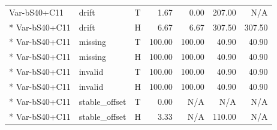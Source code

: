 \begin{small}
\begin{longtable}{lllrrrr}
Var-bS40+C11 & drift & T & 1.67 & 0.00 & 207.00 & N/A \\*
Var-bS40+C11 & drift & H & 6.67 & 6.67 & 307.50 & 307.50 \\*
Var-bS40+C11 & missing & T & 100.00 & 100.00 & 40.90 & 40.90 \\*
Var-bS40+C11 & missing & H & 100.00 & 100.00 & 40.90 & 40.90 \\*
Var-bS40+C11 & invalid & T & 100.00 & 100.00 & 40.90 & 40.90 \\*
Var-bS40+C11 & invalid & H & 100.00 & 100.00 & 40.90 & 40.90 \\*
Var-bS40+C11 & stable\_offset & T & 0.00 & N/A & N/A & N/A \\*
Var-bS40+C11 & stable\_offset & H & 3.33 & N/A & 110.00 & N/A \\
\bottomrule\end{longtable}\end{small}
